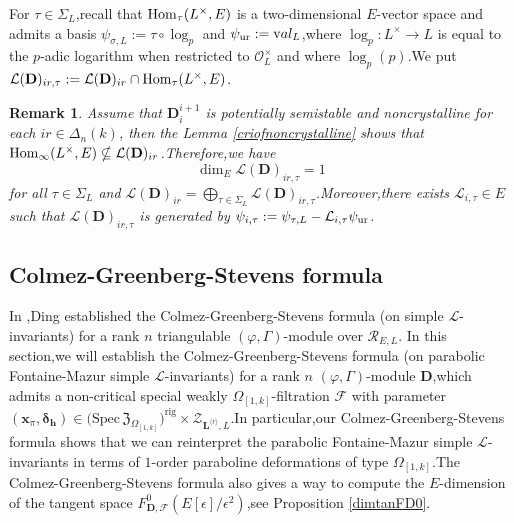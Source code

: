 \documentclass[SecEq,CM,GP]{degruyter-crelle} %
\theoremstyle{plain}
\newtheorem{rmk}[thm]{Remark}
\newcommand{\bmdel}{{ \bm{\delta}_\bh}}
\newcommand{\Dpik}{{\mathbf{D}}}
\newcommand{\homo}{{\rm Hom}}
\newcommand{\lrr}{{\langle r\rangle}}
\newcommand{\omepik}{\Omega_{[1,k]}}
\newcommand{\rigchl}{{\mathcal{Z}_{\bL^{\lrr},L}}}
\newcommand{\sbanpik}{{\big(\mathrm{Spec}\hspace{2pt}\mathfrak{Z}_{\omepik}\big)^{\mathrm{rig}}}}
\newcommand{\ur}{{\rm ur}}
\newcommand{\valua}{\mathrm val}
\newcommand{\bL}{{\mathbf{L}}}
\newcommand{\bx}{{\mathbf{x}}}
\newcommand{\bh}{{\mathbf{h}}}
\newcommand{\cR}{\mathcal R}
\newcommand{\cF}{\mathcal F}
\newcommand{\cO}{\mathcal O}
\newcommand{\sL}{\mathcal L}
\begin{document}
For $\tau\in \Sigma_L$,\;recall that $\homo_\tau(L^\times,E)$ is a two-dimensional $E$-vector space and admits a basis $\psi_{\sigma,L}:=\tau\circ\log_p$ and $\psi_{\ur}:=\valua_L$,\;where $\log_p:L^\times\rightarrow L$ is equal to the $p$-adic logarithm when restricted to $\cO_L^\times$ and where $\log_p(p)$.\;We put $\sL(\Dpik)_{ir,\tau}:=\sL(\Dpik)_{ir}\cap \homo_\tau(L^\times,E)$.\;

\begin{rmk}\label{taulinvariantrmk}Assume that $
\Dpik^{i+1}_i$ is potentially semistable and noncrystalline for each $ir\in \Delta_n(k)$, then the Lemma  \ref{criofnoncrystalline} shows that $\homo_\infty(L^\times,E)\nsubseteq \sL(\Dpik)_{ir}$.\;Therefore,\;we have $$\dim_E\sL(\Dpik)_{ir,\tau}=1$$ for all $\tau\in \Sigma_L$ and $\sL(\Dpik)_{ir}=\bigoplus_{\tau\in \Sigma_L}\sL(\Dpik)_{ir,\tau}$.\;Moreover,\;there exists $\sL_{i,\tau}\in E $ such that $\sL(\Dpik)_{ir,\tau}$ is generated by $\psi_{i,\tau}:=\psi_{\tau,L}-\sL_{i,\tau}\psi_{\ur}$.\;
\end{rmk}
%




\subsection{Colmez-Greenberg-Stevens formula}\label{cgsformulaSection}

In \cite[Section.]{2019DINGSimple},\;Ding established the Colmez-Greenberg-Stevens formula 
(on simple $\sL$-invariants) for a rank $n$ triangulable $(\varphi,\Gamma)$-module over $\cR_{E,L}$. In this section,\;we will establish the Colmez-Greenberg-Stevens formula (on parabolic Fontaine-Mazur simple $\sL$-invariants) for a  rank $n$ $(\varphi,\Gamma)$-module $\Dpik$,\;which
admits a non-critical special weakly $\omepik$-filtration $\cF$ with  parameter $(\bx_{\pi},\bmdel)\in \sbanpik\times\rigchl$.\;In particular,\;our Colmez-Greenberg-Stevens formula shows that we can reinterpret the parabolic Fontaine-Mazur simple $\sL$-invariants in terms of $1$-order paraboline deformations of type $\omepik$.\;The Colmez-Greenberg-Stevens formula also gives a way to compute the $E$-dimension of the tangent space  $F_{\Dpik,\cF}^0(E[\epsilon]/\epsilon^2)$,\;see Proposition \ref{dimtanFD0}.\;
\end{document}
